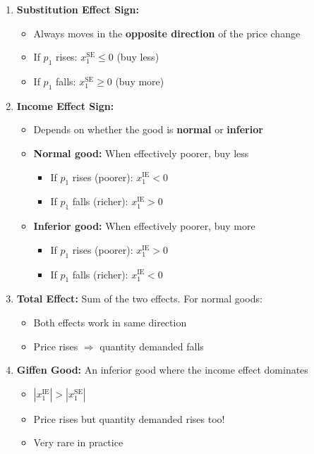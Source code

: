 \documentclass[12pt]{article}
\begin{document}
\begin{enumerate}[leftmargin=*]
\item \textbf{Substitution Effect Sign:}
\begin{itemize}
\item Always moves in the \textbf{opposite direction} of the price change
\item If $p_1$ rises: \textcolor{subcolor}{$x_1^{\text{SE}} \leq 0$} (buy less)
\item If $p_1$ falls: \textcolor{subcolor}{$x_1^{\text{SE}} \geq 0$} (buy more)
\end{itemize}

\item \textbf{Income Effect Sign:}
\begin{itemize}
\item Depends on whether the good is \textbf{normal} or \textbf{inferior}
\item \textbf{Normal good:} When effectively poorer, buy less
  \begin{itemize}
  \item If $p_1$ rises (poorer): \textcolor{incomecolor}{$x_1^{\text{IE}} < 0$}
  \item If $p_1$ falls (richer): \textcolor{incomecolor}{$x_1^{\text{IE}} > 0$}
  \end{itemize}
\item \textbf{Inferior good:} When effectively poorer, buy more
  \begin{itemize}
  \item If $p_1$ rises (poorer): \textcolor{incomecolor}{$x_1^{\text{IE}} > 0$}
  \item If $p_1$ falls (richer): \textcolor{incomecolor}{$x_1^{\text{IE}} < 0$}
  \end{itemize}
\end{itemize}

\item \textbf{Total Effect:} Sum of the two effects. For normal goods:
\begin{itemize}
\item Both effects work in same direction
\item Price rises $\Rightarrow$ quantity demanded falls
\end{itemize}

\item \textbf{Giffen Good:} An inferior good where the income effect dominates
\begin{itemize}
\item $|x_1^{\text{IE}}| > |x_1^{\text{SE}}|$
\item Price rises but quantity demanded rises too!
\item Very rare in practice
\end{itemize}
\end{enumerate}
\end{document}
